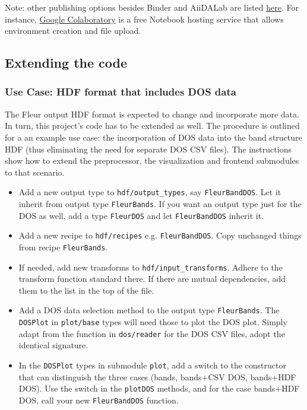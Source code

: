 Note: other publishing options besides Binder and AiiDALab are listed
\href{https://github.com/markusschanta/awesome-jupyter}{here}. For
instance, \href{http://colab.research.google.com/}{Google Colaboratory}
is a free Notebook hosting service that allows environment creation and file upload.

\subsection{Extending the code}\label{extending-the-code}

\subsubsection{Use Case: HDF format that includes DOS data}
\label{sec:use-case:-hdf}


The Fleur output HDF format is expected to change and incorporate more
data. In turn, this project's code has to be extended as well. The
procedure is outlined for a an example use case: the incorporation of
DOS data into the band structure HDF (thus eliminating the need for
separate DOS CSV files). The instructions show how to extend the
preprocessor, the visualization and frontend submodules to that
scenario.

\begin{itemize}
    \tightlist
\item
    Add a new output type to \texttt{hdf/output\_types}, say
    \texttt{FleurBandDOS}. Let it inherit from output type
    \texttt{FleurBands}. If you want an output type just for the DOS as
    well, add a type \texttt{FleurDOS} and let \texttt{FleurBandDOS}
    inherit it.
\item
    Add a new recipe to \texttt{hdf/recipes} e.g. \texttt{FleurBandDOS}.
    Copy unchanged things from recipe \texttt{FleurBands}.
\item
    If needed, add new transforms to \texttt{hdf/input\_transforms}.
    Adhere to the transform function standard there. If there are mutual
    dependencies, add them to the list in the top of the file.
\item
    Add a DOS data selection method to the output type
    \texttt{FleurBands}. The \texttt{DOSPlot} in \texttt{plot/base} types
    will need those to plot the DOS plot. Simply adapt from the function
    in \texttt{dos/reader} for the DOS CSV files, adopt the identical
    signature.
\item
    In the \texttt{DOSPlot} types in submodule \texttt{plot}, add a switch
    to the constructor that can distinguish the three cases (bands,
    bands+CSV DOS, bands+HDF DOS). Use the switch in the \texttt{plotDOS}
    methods, and for the case bands+HDF DOS, call your new
    \texttt{FleurBandDOS} function.
\end{itemize}


